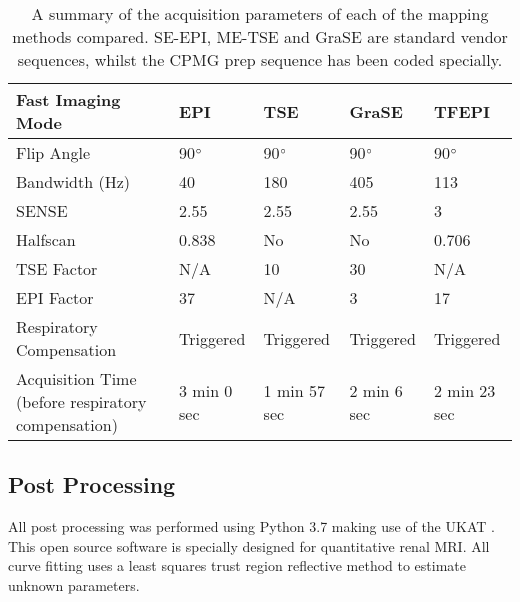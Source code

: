 \begin{table}[H]
\begin{adjustbox}{width=1.0\textwidth, center}
\begin{tabularx}{1.25\textwidth}{X|X|X|X|X}
		Fast   Imaging Mode                                  & EPI                             & TSE                        & GraSE              & TFEPI               \\ \hline
		Flip Angle                                           & 90$\degree$                     & 90$\degree$                & 90$\degree$        & 90$\degree$         \\ \hline
		Bandwidth   (Hz)                                     & 40                              & 180                        & 405                & 113                 \\ \hline
		SENSE                                                & 2.55                            & 2.55                       & 2.55               & 3                   \\ \hline
		Halfscan                                             & 0.838                           & No                         & No                 & 0.706               \\ \hline
		TSE Factor                                           & N/A                             & 10                         & 30                 & N/A                 \\ \hline
		EPI Factor                                           & 37                              & N/A                        & 3                  & 17                  \\ \hline
		Respiratory Compensation                             & Triggered                       & Triggered                  & Triggered          & Triggered           \\ \hline
		Acquisition Time \scriptsize{(before respiratory compensation)} & 3 min 0 sec                & 1 min 57 sec               & 2 min 6 sec        & 2 min 23 sec  
	\end{tabularx}
	\end{adjustbox}
	\caption{A summary of the acquisition parameters of each of the \ttwo mapping methods compared. \ac{SE}-\ac{EPI}, \ac{ME-TSE} and \ac{GraSE} are standard vendor sequences, whilst the \ac{CPMG} \ttwo prep sequence has been coded specially.}
	\label{tab:t2_sequence_overview}
\end{table}

\subsection{Post Processing}

All post processing was performed using Python 3.7 making use of the \ac{UKAT} \cite{daniel_ukrin_2021, nery_ukrin_2020}. This open source software is specially designed for quantitative renal \ac{MRI}. All curve fitting uses a least squares trust region reflective method to estimate unknown parameters.

